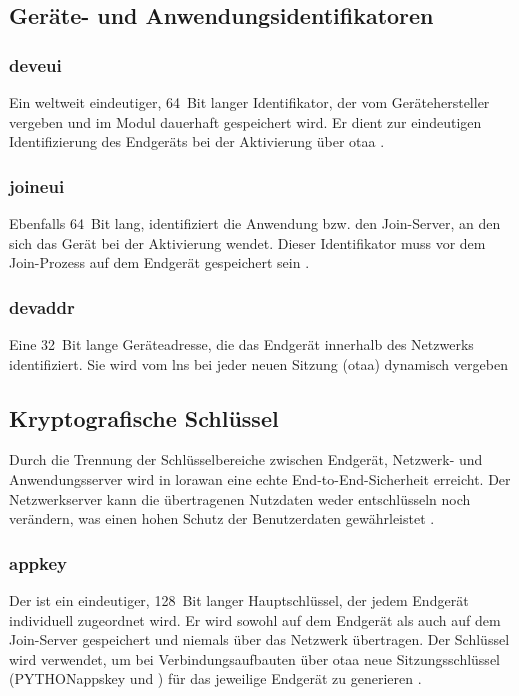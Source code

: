 	\subsection{Geräte- und Anwendungsidentifikatoren}
	
	\subsubsection{\acl{deveui} }
	Ein weltweit eindeutiger, 64~Bit langer Identifikator, der vom Gerätehersteller vergeben und im Modul dauerhaft gespeichert wird. Er dient zur eindeutigen Identifizierung des Endgeräts bei der Aktivierung über \ac{otaa} \cite[44]{LoRaAlliance:2022} \cite{Montagny:2022}.
	
	\subsubsection{\acl{joineui} }
	Ebenfalls 64~Bit lang, identifiziert die Anwendung bzw. den Join-Server, an den sich das Gerät bei der Aktivierung wendet. Dieser Identifikator muss vor dem Join-Prozess auf dem Endgerät gespeichert sein \cite[44]{LoRaAlliance:2022}.
	
	
	\subsubsection{\acl{devaddr}  \label{lorawan:deviceAddr}}
	Eine 32~Bit lange Geräteadresse, die das Endgerät innerhalb des Netzwerks identifiziert. Sie wird vom \ac{lns} bei jeder neuen Sitzung (\ac{otaa}) dynamisch vergeben \cite[42]{LoRaAlliance:2022}
	
	
	\subsection{Kryptografische Schlüssel}
	Durch die Trennung der Schlüsselbereiche zwischen Endgerät, Netzwerk- und Anwendungsserver wird in \ac{lorawan} eine echte End-to-End-Sicherheit erreicht. Der Netzwerkserver kann die übertragenen Nutzdaten weder entschlüsseln noch verändern, was einen hohen Schutz der Benutzerdaten gewährleistet \cite[43]{Montagny:2022}.
	
	\subsubsection{\acl{appkey} }
	Der  ist ein eindeutiger, 128~Bit langer Hauptschlüssel, der jedem Endgerät individuell zugeordnet wird. Er wird sowohl auf dem Endgerät als auch auf dem Join-Server gespeichert und niemals über das Netzwerk übertragen. Der Schlüssel wird verwendet, um bei Verbindungsaufbauten über \ac{otaa} neue Sitzungsschlüssel (PYTHON{\acs{appskey}} und ) für das jeweilige Endgerät zu generieren \cite[44]{LoRaAlliance:2020b}.
	
